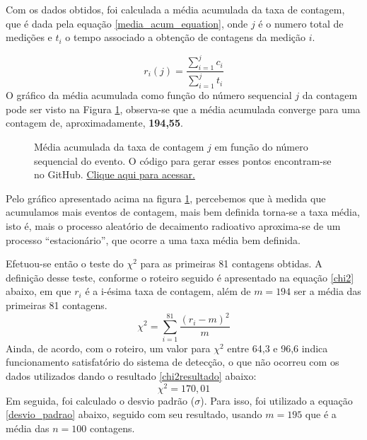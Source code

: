 \documentclass{article}
\begin{document}
Com os dados obtidos, foi calculada a média acumulada \cite{fisicaexpV} da taxa de contagem, que é dada pela equação \ref{media_acum_equation}, onde $j$ é o numero total de medições e $t _i$ o tempo associado a obtenção de contagens da medição $i$.

\begin{equation}
\label{media_acum_equation}
r_i (j) = \frac{\sum _{i=1} ^{j} c_i}{\sum _{i=1} ^{j} t_i}
\end{equation}
O gráfico da média acumulada como função do número sequencial $j$ da contagem pode ser visto na Figura \ref{media_acum}, observa-se que a média acumulada converge para uma contagem de, aproximadamente, \textbf{194,55}.

\begin{figure}[H]
    \centering
    \caption{Média acumulada da taxa de contagem $j$ em função do número sequencial do evento. O código para gerar esses pontos encontram-se no GitHub. \href{https://github.com/Vento09/Fisica\_exp\_V}{Clique aqui para acessar.}}
    \label{media_acum}
\end{figure}
Pelo gráfico apresentado acima na figura \ref{media_acum}, percebemos que à medida que acumulamos mais eventos de contagem, mais bem definida torna-se a taxa média, isto é, mais o processo aleatório de decaimento radioativo aproxima-se de um processo “estacionário”, que ocorre a uma taxa média bem definida.

Efetuou-se então o teste do $\chi ^2$ para as primeiras 81 contagens obtidas. A definição desse teste, conforme o roteiro seguido \cite{fisicaexpV} é apresentado na equação \ref{chi2} abaixo, em que $r _i$ é a i-ésima taxa de contagem, além de $m = 194$ ser a média das primeiras 81 contagens.
\begin{equation}
   \label{chi2}
	\chi ^2 = \sum_{i=1} ^{81}\frac{(r_i - m)^2}{m}
\end{equation}Ainda, de acordo, com o roteiro, um valor para $\chi ^2$ entre 64,3 e 96,6 indica funcionamento satisfatório do sistema de detecção, o que não ocorreu com os dados utilizados dando o resultado \ref{chi2resultado} abaixo:
\begin{equation}
	\label{chi2resultado}
	\chi ^2 = 170,01
\end{equation}Em seguida, foi calculado o desvio padrão ($\sigma$). Para isso, foi utilizado a equação \ref{desvio_padrao} abaixo, seguido com seu resultado, usando $m = 195$ que é a média das $n = 100$ contagens.
\end{document}
